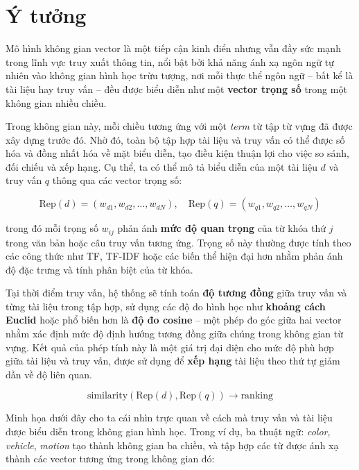 \section{Ý tưởng}
Mô hình không gian vector là một tiếp cận kinh điển nhưng vẫn đầy sức mạnh trong lĩnh vực truy xuất thông tin, nổi bật bởi khả năng ánh xạ ngôn ngữ tự nhiên vào không gian hình học trừu tượng, nơi mỗi thực thể ngôn ngữ -- bất kể là tài liệu hay truy vấn -- đều được biểu diễn như một \textbf{vector trọng số} trong một không gian nhiều chiều.

Trong không gian này, mỗi chiều tương ứng với một \textit{term} từ tập từ vựng đã được xây dựng trước đó. Nhờ đó, toàn bộ tập hợp tài liệu và truy vấn có thể được số hóa và đồng nhất hóa về mặt biểu diễn, tạo điều kiện thuận lợi cho việc so sánh, đối chiếu và xếp hạng. Cụ thể, ta có thể mô tả biểu diễn của một tài liệu \(d\) và truy vấn \(q\) thông qua các vector trọng số:

\begin{equation}
    \text{Rep}(d) = (w_{d1}, w_{d2}, \dots, w_{dN}), \quad \text{Rep}(q) = (w_{q1}, w_{q2}, \dots, w_{qN})
\end{equation}

trong đó mỗi trọng số \(w_{ij}\) phản ánh \textbf{mức độ quan trọng} của từ khóa thứ \(j\) trong văn bản hoặc câu truy vấn tương ứng. Trọng số này thường được tính theo các công thức như TF, TF-IDF hoặc các biến thể hiện đại hơn nhằm phản ánh độ đặc trưng và tính phân biệt của từ khóa.

Tại thời điểm truy vấn, hệ thống sẽ tính toán \textbf{độ tương đồng} giữa truy vấn và từng tài liệu trong tập hợp, sử dụng các độ đo hình học như \textbf{khoảng cách Euclid} hoặc phổ biến hơn là \textbf{độ đo cosine} -- một phép đo góc giữa hai vector nhằm xác định mức độ định hướng tương đồng giữa chúng trong không gian từ vựng. Kết quả của phép tính này là một giá trị đại diện cho mức độ phù hợp giữa tài liệu và truy vấn, được sử dụng để \textbf{xếp hạng} tài liệu theo thứ tự giảm dần về độ liên quan.

\begin{equation}
    \text{similarity}(\text{Rep}(d), \text{Rep}(q)) \rightarrow \text{ranking}
\end{equation}

Minh họa dưới đây cho ta cái nhìn trực quan về cách mà truy vấn và tài liệu được biểu diễn trong không gian hình học. Trong ví dụ, ba thuật ngữ: \textit{color}, \textit{vehicle}, \textit{motion} tạo thành không gian ba chiều, và tập hợp các từ được ánh xạ thành các vector tương ứng trong không gian đó:

